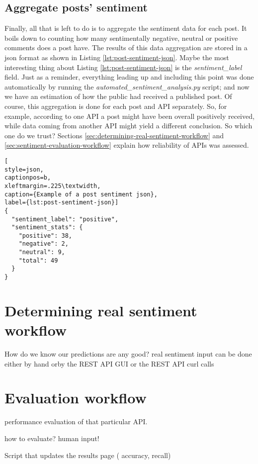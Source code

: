 \subsection*{Aggregate posts' sentiment \label{sec:aggregate-post-sentiment}}
Finally, all that is left to do is to aggregate the sentiment data for each post. 
It boils down to counting how many sentimentally negative, neutral or positive comments does a post have. 
The results of this data aggregation are stored in a json format as shown in Listing \ref{lst:post-sentiment-json}. 
Maybe the most interesting thing about Listing \ref{lst:post-sentiment-json} is the \emph{sentiment\_label} field. Just as a reminder, everything leading up and including this point was done automatically by running the \textit{automated\_sentiment\_analysis.py} script; and now we have an estimation of how the public had received a published post.
Of course, this aggregation is done for each post and API separately. So, for example, according to one API a post might have been overall positively received, while data coming from another API might yield a different conclusion. So which one do we trust? Sections \ref{sec:determining-real-sentiment-workflow}  and  \ref{sec:sentiment-evaluation-workflow} explain how reliability of APIs was assessed. 

\begin{lstlisting}[
style=json,
captionpos=b,
xleftmargin=.225\textwidth,
caption={Example of a post sentiment json},
label={lst:post-sentiment-json}]
{
  "sentiment_label": "positive", 
  "sentiment_stats": {
    "positive": 38, 
    "negative": 2,
    "neutral": 9, 
    "total": 49
  } 
}
\end{lstlisting}


\section{Determining real sentiment workflow\label{sec:determining-real-sentiment-workflow}}
How do we know our predictions are any good?
real sentiment input can be done either by hand orby the REST API GUI or the REST API curl calls





\section{Evaluation workflow\label{sec:sentiment-evaluation-workflow}}


performance evaluation of that particular API.

how to evaluate? human input! 

Script that updates the results page  ( accuracy, recall)



